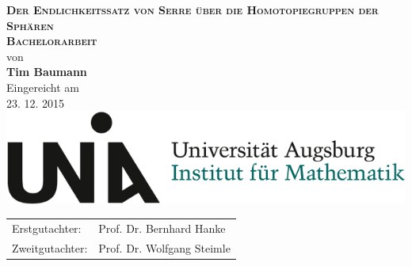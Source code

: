 
\begin{titlepage}
  \vspace*{\fill}
  \begin{center}
    \Huge \textbf{\textsc{Der Endlichkeitssatz von Serre über die Homotopiegruppen der Sphären}} \vspace{0.2cm}\\
    \vspace{2cm}
    \LARGE \textbf{\textsc{Bachelorarbeit}}\\
    von\\
    \textbf{Tim Baumann}\\
    \vspace{2.2cm}
    \large Eingereicht am \\
    23. 12. 2015 \\[1cm]
    \includegraphics[scale=0.4]{uni_aux_logo.jpg} \\[1cm]
    \vspace{1.2cm}
    \large \begin{tabular}{ll}
      Erstgutachter: & Prof. Dr. Bernhard Hanke \\
      Zweitgutachter: & Prof. Dr. Wolfgang Steimle
    \end{tabular}
  \end{center}
  \vspace*{\fill}
\end{titlepage}
